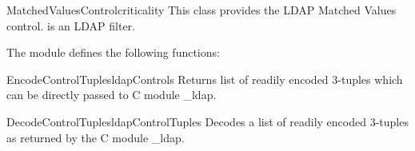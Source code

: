 \begin{classdesc}{MatchedValuesControl}{criticality }
This class provides the LDAP Matched Values control.  is an LDAP filter.
\begin{seealso}
\end{seealso}
\end{classdesc}

The  module defines the following functions:

\begin{funcdesc}{EncodeControlTuples}{ldapControls} %
  Returns list of readily encoded 3-tuples which can be directly
  passed to C module _ldap.
\end{funcdesc}


\begin{funcdesc}{DecodeControlTuples}{ldapControlTuples} %
  Decodes a list of readily encoded 3-tuples as returned by the C module _ldap.
\end{funcdesc}

